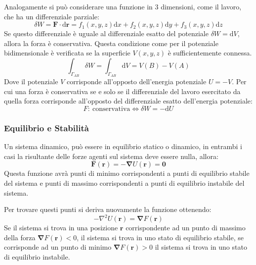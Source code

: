 \documentclass{article}
\newcommand{\vect}[1]{\boldsymbol{\mathbf{#1}}}
\newcommand{\df}{\mathrm{d}}
\numberwithin{equation}{subsection}
\begin{document}
Analogamente si può considerare una funzione in $3$ dimensioni, 
come il lavoro, che ha un differenziale parziale: 
\begin{equation*}
    \delta W=\vect{F}\cdot \df\vect{r}=f_1(x,y,z)\df x+f_2(x,y,z)\df y+f_3(x,y,z)\df z
\end{equation*}
Se questo differenziale è uguale al differenziale 
esatto del potenziale $\delta W =\df V$, allora la forza 
è conservativa. Questa condizione come per il potenziale bidimensionale è verificata se la superficie $V(x,y,z)$ è sufficientemente connessa. 
\begin{equation}
    \int_{\Gamma_{AB}}\delta W = \int_{\Gamma_{AB}}\df V=V(B)-V(A)
\end{equation}
Dove il potenziale $V$ corrisponde all'opposto dell'energia 
potenziale $U=-V$.
Per cui una forza è conservativa se e solo se il differenziale del lavoro esercitato da quella forza corrisponde all'opposto del differenziale esatto dell'energia potenziale: 
\begin{equation}
    F:\:\mbox{conservativa}\iff\delta W=-\df U
\end{equation}

\subsubsection{Equilibrio e Stabilità}
Un sistema dinamico, può essere in equilibrio statico o dinamico, 
in entrambi i casi la risultante delle forze agenti sul sistema 
deve essere nulla, allora:
\begin{equation*}
    \vect{F}(\vect{r})=-\vect{\nabla}U(\vect{r})=\vect{0}
\end{equation*}
Questa funzione avrà punti di minimo corrispondenti a 
punti di equilibrio stabile del sistema e punti di massimo 
corrispondenti a punti di equilibrio instabile del sistema. 


Per trovare questi punti si deriva nuovamente la funzione 
ottenendo:
\begin{equation*}
    -\nabla^{2}U(\vect{r})=\vect\nabla F(\vect{r})
\end{equation*}
Se il sistema si trova in una posizione $\vect{r}$ corrispondente ad un punto di massimo della forza $\vect\nabla F(\vect{r})<0$, il sistema si trova in uno stato di equilibrio stabile, 
se corrisponde ad un punto di minimo $\vect\nabla F(\vect{r})>0$ il sistema si trova in uno stato di equilibrio instabile. 
\end{document}
